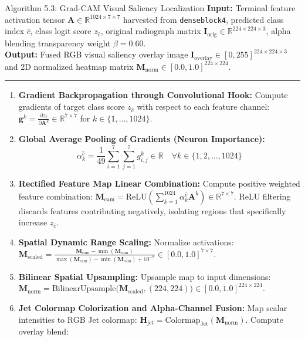 \documentclass[12pt,a4paper]{report}
\begin{document}
\begin{algoBox}{Algorithm 5.3: Grad-CAM Visual Saliency Localization}
\label{algo:gradcam_attribution}
\textbf{Input:} Terminal feature activation tensor $\mathbf{A} \in \mathbb{R}^{1024 \times 7 \times 7}$ harvested from \texttt{denseblock4}, predicted class index $\hat{c}$, class logit score $z_{\hat{c}}$, original radiograph matrix $\mathbf{I}_{\text{orig}} \in \mathbb{R}^{224 \times 224 \times 3}$, alpha blending transparency weight $\beta = 0.60$.\\
\textbf{Output:} Fused RGB visual saliency overlay image $\mathbf{I}_{\text{overlay}} \in [0, 255]^{224 \times 224 \times 3}$ and 2D normalized heatmap matrix $\mathbf{M}_{\text{norm}} \in [0.0, 1.0]^{224 \times 224}$.\\[-6pt]
\noindent\rule{\linewidth}{0.4pt}
\begin{enumerate}[1:]
  \item \textbf{Gradient Backpropagation through Convolutional Hook:} Compute gradients of target class score $z_{\hat{c}}$ with respect to each feature channel: $\mathbf{g}^k = \frac{\partial z_{\hat{c}}}{\partial \mathbf{A}^k} \in \mathbb{R}^{7 \times 7}$ for $k \in \{1, \dots, 1024\}$.
  \item \textbf{Global Average Pooling of Gradients (Neuron Importance):}
    \begin{equation*}
      \alpha_k^{\hat{c}} = \frac{1}{49} \sum_{i=1}^7 \sum_{j=1}^7 g_{i, j}^k \in \mathbb{R} \quad \forall k \in \{1, 2, \dots, 1024\}
    \end{equation*}
  \item \textbf{Rectified Feature Map Linear Combination:} Compute positive weighted feature combination: $\mathbf{M}_{\text{cam}} = \mathrm{ReLU}\left( \sum_{k=1}^{1024} \alpha_k^{\hat{c}} \mathbf{A}^k \right) \in \mathbb{R}^{7 \times 7}$. ReLU filtering discards features contributing negatively, isolating regions that specifically increase $z_{\hat{c}}$.
  \item \textbf{Spatial Dynamic Range Scaling:} Normalize activations: $\mathbf{M}_{\text{scaled}} = \frac{\mathbf{M}_{\text{cam}} - \min(\mathbf{M}_{\text{cam}})}{\max(\mathbf{M}_{\text{cam}}) - \min(\mathbf{M}_{\text{cam}}) + 10^{-8}} \in [0.0, 1.0]^{7 \times 7}$.
  \item \textbf{Bilinear Spatial Upsampling:} Upsample map to input dimensions: $\mathbf{M}_{\text{norm}} = \mathrm{BilinearUpsample}\big(\mathbf{M}_{\text{scaled}}, (224, 224)\big) \in [0.0, 1.0]^{224 \times 224}$.
  \item \textbf{Jet Colormap Colorization and Alpha-Channel Fusion:} Map scalar intensities to RGB Jet colormap: $\mathbf{H}_{\text{jet}} = \mathrm{Colormap}_{\text{Jet}}(\mathbf{M}_{\text{norm}})$. Compute overlay blend:

\end{enumerate}
\end{algoBox}
\end{document}
